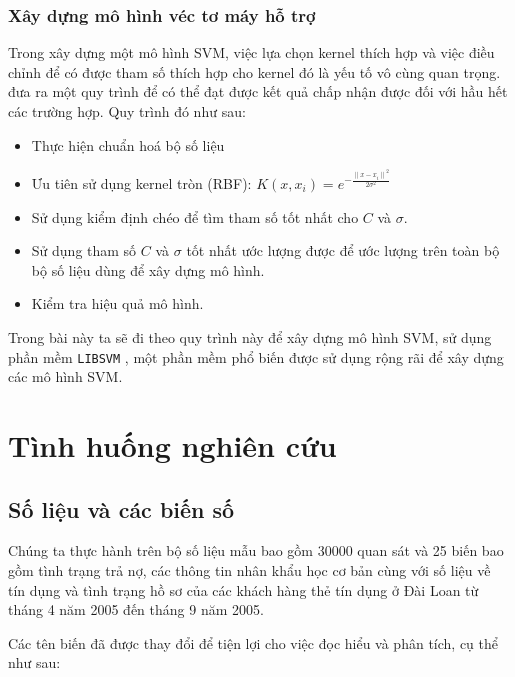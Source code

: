 \documentclass[a4paper]{report}\usepackage[]{graphicx}\usepackage[]{color}
\begin{document}
\subsection{Xây dựng mô hình véc tơ máy hỗ trợ}

Trong xây dựng một mô hình SVM, việc lựa chọn kernel thích hợp và việc điều chỉnh để có được tham số thích hợp cho kernel đó là yếu tố vô cùng quan trọng. 
\textcite{hsu2003practical} đưa ra một quy trình để có thể đạt được kết quả chấp nhận được đối với hầu hết các trường hợp. Quy trình đó như sau:

\begin{itemize}
  \item Thực hiện chuẩn hoá bộ số liệu
  \item Ưu tiên sử dụng kernel tròn (RBF): $K(x, x_i) = e^{-\frac{{\|x - x_i\|}^2}{2 \sigma^2}}$
  \item Sử dụng kiểm định chéo để tìm tham số tốt nhất cho $C$ và $\sigma$.
  \item Sử dụng tham số $C$ và $\sigma$ tốt nhất ước lượng được để ước lượng trên toàn bộ bộ số liệu dùng để xây dựng mô hình.
  \item Kiểm tra hiệu quả mô hình.
\end{itemize}

Trong bài này ta sẽ đi theo quy trình này để xây dựng mô hình SVM, sử dụng phần mềm \texttt{LIBSVM} \textcite{CC01a}, một phần mềm phổ biến được sử dụng rộng rãi để xây dựng các mô hình SVM.


\chapter{Tình huống nghiên cứu}

\section{Số liệu và các biến số}

Chúng ta thực hành trên bộ số liệu mẫu bao gồm 30000 quan sát và 25 biến bao gồm tình trạng trả nợ, các thông tin nhân khẩu học cơ bản cùng với số liệu về tín dụng và tình trạng hồ sơ của các khách hàng thẻ tín dụng ở Đài Loan từ tháng 4 năm 2005 đến tháng 9 năm 2005.

Các tên biến đã được thay đổi để tiện lợi cho việc đọc hiểu và phân tích, cụ thể như sau:
\end{document}
